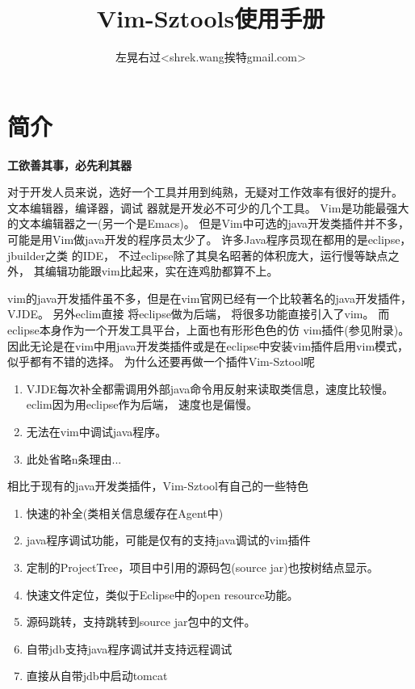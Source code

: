 \documentclass[oneside,openany]{book}
\title{Vim-Sztools使用手册}
\author{左晃右过<shrek.wang挨特gmail.com>}
\begin{document}
\maketitle

\chapter{简介}

  \begin{center}
    \large\textbf{工欲善其事，必先利其器}
  \end{center}

  对于开发人员来说，选好一个工具并用到纯熟，无疑对工作效率有很好的提升。 文本编辑器，编译器，调试
器就是开发必不可少的几个工具。  Vim是功能最强大的文本编辑器之一(另一个是Emacs)。 
但是Vim中可选的java开发类插件并不多， 可能是用Vim做java开发的程序员太少了。 许多Java程序员现在都用的是eclipse，jbuilder之类
的IDE， 不过eclipse除了其臭名昭著的体积庞大，运行慢等缺点之外， 其编辑功能跟vim比起来，实在连鸡肋都算不上。 

  vim的java开发插件虽不多，但是在vim官网已经有一个比较著名的java开发插件，VJDE。 另外eclim直接
将eclipse做为后端， 将很多功能直接引入了vim。 而eclipse本身作为一个开发工具平台，上面也有形形色色的仿
vim插件(参见附录)。因此无论是在vim中用java开发类插件或是在eclipse中安装vim插件启用vim模式， 似乎都有不错的选择。
为什么还要再做一个插件Vim-Sztool呢
  
  \begin{enumerate}
    \item VJDE每次补全都需调用外部java命令用反射来读取类信息，速度比较慢。eclim因为用eclipse作为后端， 速度也是偏慢。
    \item 无法在vim中调试java程序。
    \item 此处省略n条理由...
  \end{enumerate}

  相比于现有的java开发类插件，Vim-Sztool有自己的一些特色
  \begin{enumerate}
    \item 快速的补全(类相关信息缓存在Agent中)
    \item java程序调试功能，可能是仅有的支持java调试的vim插件
    \item 定制的ProjectTree，项目中引用的源码包(source jar)也按树结点显示。
    \item 快速文件定位，类似于Eclipse中的open resource功能。
    \item 源码跳转，支持跳转到source jar包中的文件。
    \item 自带jdb支持java程序调试并支持远程调试
    \item 直接从自带jdb中启动tomcat
  \end{enumerate}
\end{document}
